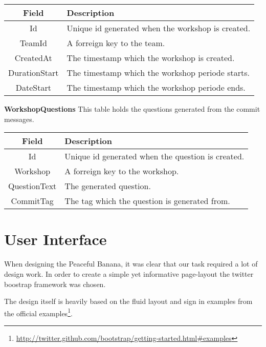\vspace{0.5cm}
\begin{tabularx}{\linewidth}{| c | X |}
    \hline
    \rowcolor[gray]{0.8}
    \textbf{Field} & \textbf{Description} \\
    \hline
    Id & Unique id generated when the workshop is created.\\ \hline
   	TeamId & A forreign key to the team.\\ \hline
   	CreatedAt & The timestamp which the workshop is created.\\ \hline
   	DurationStart & The timestamp which the workshop periode starts.\\ \hline
   	DateStart & The timestamp which the workshop periode ends.\\ 
    \hline
\end{tabularx}
\vspace{0.5cm}

\textbf{WorkshopQuestions}
This table holds the questions generated from the commit messages. \\

\vspace{0.5cm}
\begin{tabularx}{\linewidth}{| c | X |}
    \hline
    \rowcolor[gray]{0.8}
    \textbf{Field} & \textbf{Description} \\
    \hline
    Id & Unique id generated when the question is created.\\ \hline
   	Workshop & A forreign key to the workshop.\\ \hline
   	QuestionText & The generated question.\\ \hline
   	CommitTag & The tag which the question is generated from.\\ 
    \hline
\end{tabularx}
\vspace{0.5cm}

\section{User Interface}
When designing the Peaceful Banana, it was clear that our task required a lot of design work. In order to create a simple yet informative page-layout the twitter boostrap framework was chosen.

The design itself is heavily based on the fluid layout and sign in examples from the official examples\footnote{\url{http://twitter.github.com/bootstrap/getting-started.html#examples}}.

